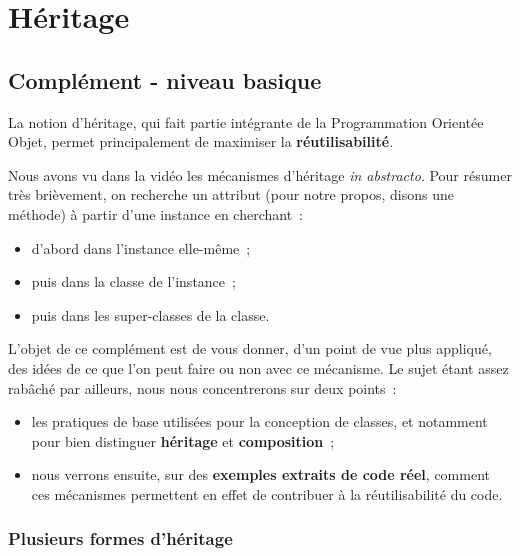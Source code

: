     
    
    
    

    

    \hypertarget{huxe9ritage}{%
\section{Héritage}\label{huxe9ritage}}

    \hypertarget{compluxe9ment---niveau-basique}{%
\subsection{Complément - niveau
basique}\label{compluxe9ment---niveau-basique}}

    La notion d'héritage, qui fait partie intégrante de la Programmation
Orientée Objet, permet principalement de maximiser la
\textbf{réutilisabilité}.

Nous avons vu dans la vidéo les mécanismes d'héritage \emph{in
abstracto}. Pour résumer très brièvement, on recherche un attribut (pour
notre propos, disons une méthode) à partir d'une instance en cherchant~:

\begin{itemize}
\tightlist
\item
  d'abord dans l'instance elle-même~;
\item
  puis dans la classe de l'instance~;
\item
  puis dans les super-classes de la classe.
\end{itemize}

    L'objet de ce complément est de vous donner, d'un point de vue plus
appliqué, des idées de ce que l'on peut faire ou non avec ce mécanisme.
Le sujet étant assez rabâché par ailleurs, nous nous concentrerons sur
deux points~:

\begin{itemize}
\tightlist
\item
  les pratiques de base utilisées pour la conception de classes, et
  notamment pour bien distinguer \textbf{héritage} et
  \textbf{composition}~;
\item
  nous verrons ensuite, sur des \textbf{exemples extraits de code réel},
  comment ces mécanismes permettent en effet de contribuer à la
  réutilisabilité du code.
\end{itemize}

    \hypertarget{plusieurs-formes-dhuxe9ritage}{%
\subsubsection{Plusieurs formes
d'héritage}\label{plusieurs-formes-dhuxe9ritage}}

